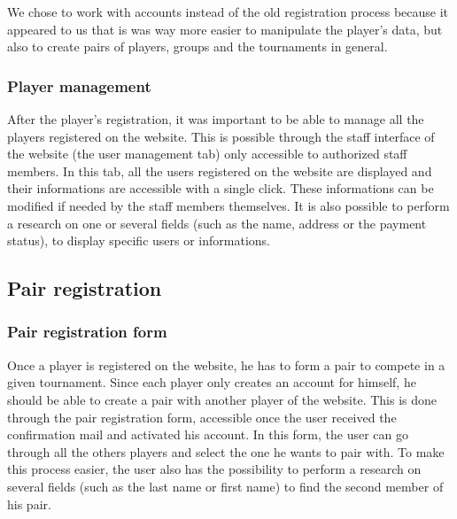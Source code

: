 We chose to work with accounts instead of the old registration process because it appeared to us that is was way more easier to manipulate the player's data, but also to create pairs of players, groups and the tournaments in general.

\subsubsection{Player management}
\label{subs:Player management}


After the player's registration, it was important to be able to manage all the players registered on the website. This is possible through the staff interface of the website (the user management tab) only accessible to authorized staff members. In this tab, all the users registered on the website are displayed and their informations are accessible with a single click. These informations can be modified if needed by the staff members themselves. It is also possible to perform a research on one or several fields (such as the name, address or the payment status), to display specific users or informations.

\subsection{Pair registration}
\label{sub:Pair registration}

\subsubsection{Pair registration form}
\label{subs:Pair registration form}


Once a player is registered on the website, he has to form a pair to compete in a given tournament. Since each player only creates an account for himself, he should be able to create a pair with another player of the website. This is done through the pair registration form, accessible once the user received the confirmation mail and activated his account. In this form, the user can go through all the others players and select the one he wants to pair with. To make this process easier, the user also has the possibility to perform a research on several fields (such as the last name or first name) to find the second member of his pair. \newline

